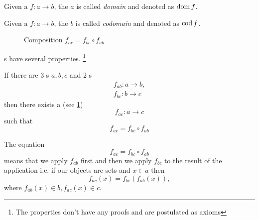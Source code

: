\begin{definition}[Domain]
  \label{def:domain}
  Given a  $f: a \to b$, the
   $a$ is called \textit{domain} and denoted as $\operatorname{dom} f$.
\end{definition}

\begin{definition}[Codomain]
  \label{def:codomain}
  Given a  $f: a \to b$, the
   $b$ is called \textit{codomain} and denoted as $\operatorname{cod} f$.
\end{definition}

\begin{figure}[H]
  \centering
  \caption{Composition $f_{ac} = f_{bc} \circ f_{ab}$}
  \label{fig:composition}
\end{figure}

s have several properties. \footnote{The
  properties don't have any proofs and are postulated as axioms}
\begin{axiom}[Composition]
  \label{axm:composition}
  If there are 3 s $a, b, c$ and 2
  s 
  \begin{eqnarray}
  f_{ab} : a \rightarrow b,
  \nonumber \\
  f_{bc} : b \rightarrow c
  \nonumber 
  \end{eqnarray}
  then there exists a  (see \cref{fig:composition})
  \[
  f_{ac} : a \rightarrow c
  \]
  such that
  \[
  f_{ac} = f_{bc} \circ f_{ab}
  \]
\end{axiom}

\begin{remark}[Composition]
  \label{rem:composition}
  The equation
  \[
  f_{ac} = f_{bc} \circ f_{ab}
  \]
  means that we apply $f_{ab}$ first and then we apply $f_{bc}$ to the
  result of the application i.e. if our objects are sets and $x \in a$
  then 
  \[
  f_{ac} ( x ) = f_{bc} ( f_{ab} ( x ) ),
  \]
  where $f_{ab} ( x ) \in b, f_{ac} ( x ) \in c$.
\end{remark}

